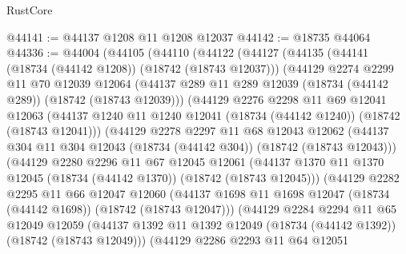 \begin{lexlean}{RustCore}
\begin{coremodule}
@44141 := @44137 @1208 @11 @1208 @12037
@44142 := @18735 @44064
@44336 := @44004
    (@44105
      (@44110
        (@44122
          (@44127
            (@44135
              (@44141 (@18734 (@44142 @1208)) (@18742 (@18743 @12037)))
              (@44129
                @2274
                @2299
                @11
                @70
                @12039
                @12064
                (@44137 @289 @11 @289 @12039 (@18734 (@44142 @289)) (@18742 (@18743 @12039)))
                (@44129
                  @2276
                  @2298
                  @11
                  @69
                  @12041
                  @12063
                  (@44137 @1240 @11 @1240 @12041 (@18734 (@44142 @1240)) (@18742 (@18743 @12041)))
                  (@44129
                    @2278
                    @2297
                    @11
                    @68
                    @12043
                    @12062
                    (@44137 @304 @11 @304 @12043 (@18734 (@44142 @304)) (@18742 (@18743 @12043)))
                    (@44129
                      @2280
                      @2296
                      @11
                      @67
                      @12045
                      @12061
                      (@44137
                        @1370
                        @11
                        @1370
                        @12045
                        (@18734 (@44142 @1370))
                        (@18742 (@18743 @12045)))
                      (@44129
                        @2282
                        @2295
                        @11
                        @66
                        @12047
                        @12060
                        (@44137
                          @1698
                          @11
                          @1698
                          @12047
                          (@18734 (@44142 @1698))
                          (@18742 (@18743 @12047)))
                        (@44129
                          @2284
                          @2294
                          @11
                          @65
                          @12049
                          @12059
                          (@44137
                            @1392
                            @11
                            @1392
                            @12049
                            (@18734 (@44142 @1392))
                            (@18742 (@18743 @12049)))
                          (@44129
                            @2286
                            @2293
                            @11
                            @64
                            @12051

\end{coremodule}
\end{lexlean}
